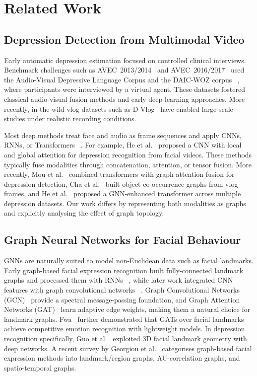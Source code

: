 \documentclass[conference]{IEEEtran}
\begin{document}
\section{Related Work}
\label{sec:related}

\subsection{Depression Detection from Multimodal Video}

Early automatic depression estimation focused on controlled clinical interviews.
Benchmark challenges such as AVEC~2013/2014~
\cite{valstar2014avec} and AVEC~2016/2017~
\cite{ringeval2017avec} used the Audio-Visual Depressive Language Corpus and the DAIC-WOZ corpus~
\cite{gratch2014daic}, where participants were interviewed by a virtual agent.
These datasets fostered classical audio-visual fusion methods and early deep-learning approaches.
More recently, in-the-wild vlog datasets such as D-Vlog~
\cite{yoon2022dvlog} have enabled large-scale studies under realistic recording conditions.

Most deep methods treat face and audio as frame sequences and apply CNNs, RNNs, or Transformers~
\cite{zhou2023tamfn,tao2024depmstat,hua2026asym,he2021automatic,caiinet2023}.
For example, He et al.~
\cite{he2021automatic} proposed a CNN with local and global attention for depression recognition from facial videos.
These methods typically fuse modalities through concatenation, attention, or tensor fusion.
More recently, Mou et al.~
\cite{disentangled2025} combined transformers with graph attention fusion for depression detection, Cha et al.~
\cite{mogam2024} built object co-occurrence graphs from vlog frames, and He et al.~
\cite{dpdnet2024} proposed a GNN-enhanced transformer across multiple depression datasets.
Our work differs by representing both modalities as graphs and explicitly analysing the effect of graph topology.

\subsection{Graph Neural Networks for Facial Behaviour}

GNNs are naturally suited to model non-Euclidean data such as facial landmarks.
Early graph-based facial expression recognition built fully-connected landmark graphs and processed them with RNNs~
\cite{zhong2019graphbrnn}, while later work integrated CNN features with graph convolutional networks~
\cite{liao2022fergcn}.
Graph Convolutional Networks (GCN)~
\cite{kipf2017gcn} provide a spectral message-passing foundation, and Graph Attention Networks (GAT)~
\cite{velickovic2018graph} learn adaptive edge weights, making them a natural choice for landmark graphs.
Fwa~
\cite{stgat2022} further demonstrated that GATs over facial landmarks achieve competitive emotion recognition with lightweight models.
In depression recognition specifically, Guo et al.~
\cite{guo2021deep} exploited 3D facial landmark geometry with deep networks.
A recent survey by Georgiou et al.~
\cite{ferreview2026} categorises graph-based facial expression methods into landmark/region graphs, AU-correlation graphs, and spatio-temporal graphs.
\end{document}
